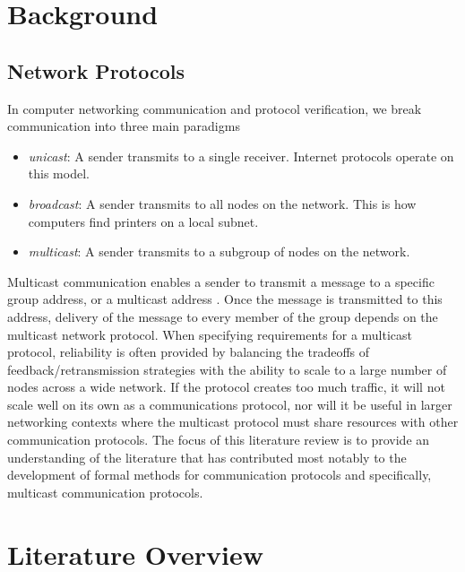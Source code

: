 \documentclass[12pt, fullpage]{article}
\begin{document}
\section{Background}
\bigbreak
\subsection{Network Protocols}
In computer networking communication and protocol verification, we break communication into three main paradigms
\begin{itemize}
	\item \textit{unicast}: A sender transmits to a single receiver. Internet protocols operate on this model.
	\item \textit{broadcast}: A sender transmits to all nodes on the network. This is how computers find printers on a local subnet.
	\item \textit{multicast}: A sender transmits to a subgroup of nodes on the network.
\end{itemize}
\bigbreak
Multicast communication enables a sender to transmit a message to a specific group address, or a multicast address \cite{Lien2004FormalMA}. Once the message is transmitted to this address, delivery of the message to every member of the group depends on the multicast network protocol. When specifying requirements for a multicast protocol, reliability is often provided by balancing the tradeoffs of feedback/retransmission strategies with the ability to scale to a large number of nodes across a wide network. If the protocol creates too much traffic, it will not scale well on its own as a communications protocol, nor will it be useful in larger networking contexts where the multicast protocol must share resources with other communication protocols. The focus of this literature review is to provide an understanding of the literature that has contributed most notably to the development of formal methods for communication protocols and specifically, multicast communication protocols.

\section{Literature Overview}
\bigbreak
\end{document}
